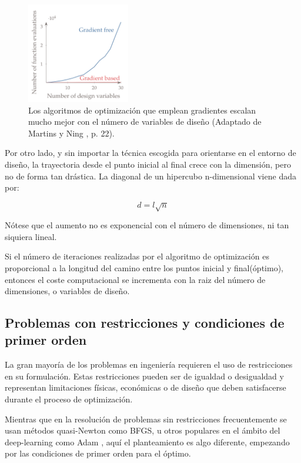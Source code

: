 \begin{figure}[h]
	\centering
	\includegraphics[width=0.4\textwidth]{./capitulos/metodologia/images/gradient_based_vs_gradient_free.png}
	\caption{Los algoritmos de optimización que emplean gradientes escalan mucho mejor con el número de variables de diseño (Adaptado de Martins y Ning \cite{mdobook}, p. 22).}
	\label{fig:gradient_based_vs_gradient_free}
\end{figure}

Por otro lado, y sin importar la técnica escogida para orientarse en el entorno
de diseño, la trayectoria desde el punto inicial al final crece con la
dimensión, pero no de forma tan drástica. La diagonal de un hipercubo
n-dimensional viene dada por:

\begin{equation}
	d = l\sqrt{n}
\end{equation}

Nótese que el aumento no es exponencial con el número de dimensiones, ni tan
siquiera lineal.

Si el número de iteraciones realizadas por el algoritmo de optimización es
proporcional a la longitud del camino entre los puntos inicial y final(óptimo),
entonces el coste computacional se incrementa con la raiz del número de
dimensiones, o variables de diseño.

\subsection{Problemas con restricciones y condiciones de primer orden}

La gran mayoría de los problemas en ingeniería requieren el uso de
restricciones en su formulación. Estas restricciones pueden ser de igualdad o
desigualdad y representan limitaciones físicas, económicas o de diseño que
deben satisfacerse durante el proceso de optimización.

Mientras que en la resolución de problemas sin restricciones frecuentemente se
usan métodos quasi-Newton como BFGS, u otros populares en el ámbito del
deep-learning como Adam \cite{kingma2014adam}, aquí el planteamiento es algo
diferente, empezando por las condiciones de primer orden para el óptimo.

